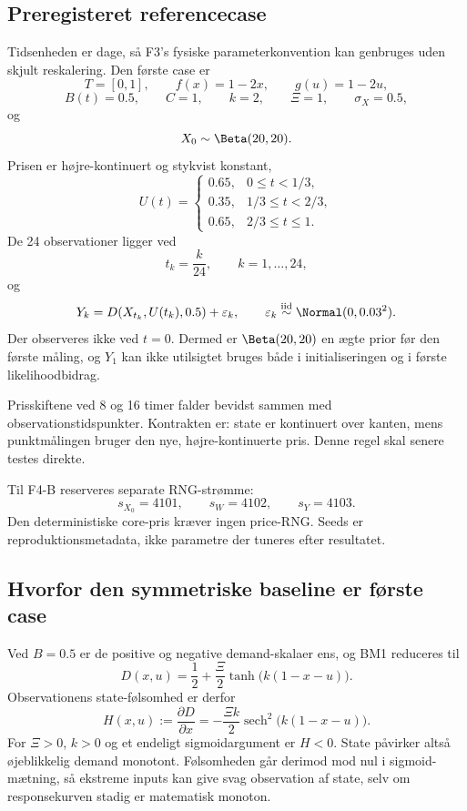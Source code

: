 \subsection{Preregisteret referencecase}

Tidsenheden er dage, så F3's fysiske parameterkonvention kan genbruges uden skjult
reskalering. Den første case er
\[
 T=[0,1],\qquad
 f(x)=1-2x,\qquad
 g(u)=1-2u,
\]
\[
 B(t)=0.5,\qquad
 C=1,\qquad k=2,\qquad \Xi=1,\qquad \sigma_X=0.5,
\]
og
\[
 X_0\sim\Beta(20,20).
\]
Prisen er højre-kontinuert og stykvist konstant,
\[
 U(t)=
 \begin{cases}
 0.65,&0\le t<1/3,\\
 0.35,&1/3\le t<2/3,\\
 0.65,&2/3\le t\le1.
 \end{cases}
\]
De 24 observationer ligger ved
\[
 t_k=\frac{k}{24},\qquad k=1,\ldots,24,
\]
og
\[
 Y_k=D(X_{t_k},U(t_k),0.5)+\varepsilon_k,
 \qquad
 \varepsilon_k\stackrel{\mathrm{iid}}{\sim}\Normal(0,0.03^2).
\]
Der observeres ikke ved \(t=0\). Dermed er \(\Beta(20,20)\) en ægte prior før den
første måling, og \(Y_1\) kan ikke utilsigtet bruges både i initialiseringen og i
første likelihoodbidrag.

Prisskiftene ved 8 og 16 timer falder bevidst sammen med observationstidspunkter.
Kontrakten er: state er kontinuert over kanten, mens punktmålingen bruger den nye,
højre-kontinuerte pris. Denne regel skal senere testes direkte.

Til F4-B reserveres separate RNG-strømme:
\[
 s_{X_0}=4101,\qquad s_W=4102,\qquad s_Y=4103.
\]
Den deterministiske core-pris kræver ingen price-RNG. Seeds er reproduktionsmetadata,
ikke parametre der tuneres efter resultatet.

\subsection{Hvorfor den symmetriske baseline er første case}

Ved \(B=0.5\) er de positive og negative demand-skalaer ens, og BM1 reduceres til
\begin{equation}
 D(x,u)=\frac12+\frac{\Xi}{2}\tanh\!\bigl(k(1-x-u)\bigr).
 \label{eq:f4a_demand}
\end{equation}
Observationens state-følsomhed er derfor
\begin{equation}
 H(x,u):=\frac{\partial D}{\partial x}
 =-\frac{\Xi k}{2}\operatorname{sech}^2\!\bigl(k(1-x-u)\bigr).
 \label{eq:f4a_gain}
\end{equation}
For \(\Xi>0\), \(k>0\) og et endeligt sigmoidargument er \(H<0\). State påvirker altså
øjeblikkelig demand monotont. Følsomheden går derimod mod nul i sigmoid-mætning, så
ekstreme inputs kan give svag observation af state, selv om responsekurven stadig er
matematisk monoton.

